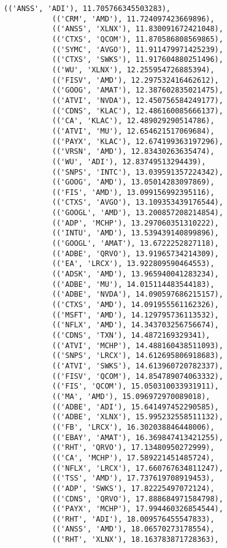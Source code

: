 \documentclass[11pt]{article}
\begin{document}
\begin{Verbatim}[commandchars=\\\{\}]
           (('ANSS', 'ADI'), 11.705766345503283),
           (('CRM', 'AMD'), 11.724097423669896),
           (('ANSS', 'XLNX'), 11.830091672421048),
           (('CTXS', 'QCOM'), 11.870586808569865),
           (('SYMC', 'AVGO'), 11.911479971425239),
           (('CTXS', 'SWKS'), 11.917604880251496),
           (('WU', 'XLNX'), 12.255954726885394),
           (('FISV', 'AMD'), 12.297532416462612),
           (('GOOG', 'AMAT'), 12.387602835021475),
           (('ATVI', 'NVDA'), 12.450756584249177),
           (('CDNS', 'KLAC'), 12.486160085666137),
           (('CA', 'KLAC'), 12.489029290514786),
           (('ATVI', 'MU'), 12.654621517069684),
           (('PAYX', 'KLAC'), 12.674199363197296),
           (('VRSN', 'AMD'), 12.83430263635474),
           (('WU', 'ADI'), 12.83749513294439),
           (('SNPS', 'INTC'), 13.039591357224342),
           (('GOOG', 'AMD'), 13.05014283097869),
           (('FIS', 'AMD'), 13.099156992395116),
           (('CTXS', 'AVGO'), 13.109353439176544),
           (('GOOGL', 'AMD'), 13.200857208214854),
           (('ADP', 'MCHP'), 13.297060351310222),
           (('INTU', 'AMD'), 13.539439140899896),
           (('GOOGL', 'AMAT'), 13.6722252827118),
           (('ADBE', 'QRVO'), 13.91965734214309),
           (('EA', 'LRCX'), 13.922809590464553),
           (('ADSK', 'AMD'), 13.965940041283234),
           (('ADBE', 'MU'), 14.015114483544183),
           (('ADBE', 'NVDA'), 14.090597686215157),
           (('CTXS', 'AMD'), 14.091955561162326),
           (('MSFT', 'AMD'), 14.129795736113532),
           (('NFLX', 'AMD'), 14.343703256756674),
           (('CDNS', 'TXN'), 14.4872169329341),
           (('ATVI', 'MCHP'), 14.488160438511093),
           (('SNPS', 'LRCX'), 14.612695806918683),
           (('ATVI', 'SWKS'), 14.613960720782337),
           (('FISV', 'QCOM'), 14.854789074063332),
           (('FIS', 'QCOM'), 15.050310033931911),
           (('MA', 'AMD'), 15.096972970089018),
           (('ADBE', 'ADI'), 15.641497452290585),
           (('ADBE', 'XLNX'), 15.995232558511132),
           (('FB', 'LRCX'), 16.302038846448006),
           (('EBAY', 'AMAT'), 16.369847413421255),
           (('RHT', 'QRVO'), 17.13480950272999),
           (('CA', 'MCHP'), 17.589221451485724),
           (('NFLX', 'LRCX'), 17.660767634811247),
           (('TSS', 'AMD'), 17.737619708919453),
           (('ADP', 'SWKS'), 17.82225497072124),
           (('CDNS', 'QRVO'), 17.888684971584798),
           (('PAYX', 'MCHP'), 17.994460326854544),
           (('RHT', 'ADI'), 18.009576455547833),
           (('ANSS', 'AMD'), 18.06570273178554),
           (('RHT', 'XLNX'), 18.163783871728363),

\end{Verbatim}
\end{document}
